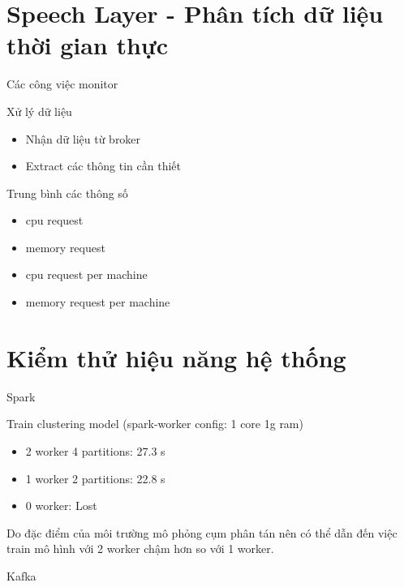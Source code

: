 \documentclass[10pt,xcolor={dvipsnames}]{beamer}
\begin{document}
	\section{Speech Layer - Phân tích dữ liệu thời gian thực} 
	
	\begin{frame}
	{Các công việc monitor}
		\begin{block}
		{Xử lý dữ liệu}
		\begin{itemize}
			\item Nhận dữ liệu từ broker
			\item Extract các thông tin cần thiết
		\end{itemize}
		\end{block}
		
		\begin{block}
		{Trung bình các thông số}
		\begin{itemize}
			\item cpu request
			\item memory request
			\item cpu request per machine
			\item memory request per machine
		\end{itemize}
		\end{block}
	\end{frame}
	
	\section{Kiểm thử hiệu năng hệ thống}
	
	\begin{frame}
	{Spark}
		\begin{block}
		{Train clustering model (spark-worker config: 1 core 1g ram)}
		\begin{itemize}
			\item 2 worker 4 partitions: 27.3 s 
			\item 1 worker 2 partitions: 22.8 s
			\item 0 worker: Lost
		\end{itemize}
		Do đặc điểm của môi trường mô phỏng cụm phân tán nên có thể dẫn đến việc train mô hình với 2 worker chậm hơn so với 1 worker.
		\end{block}
	\end{frame}
	
	\begin{frame}
	{Kafka}
	\end{frame}
	
\end{document}
